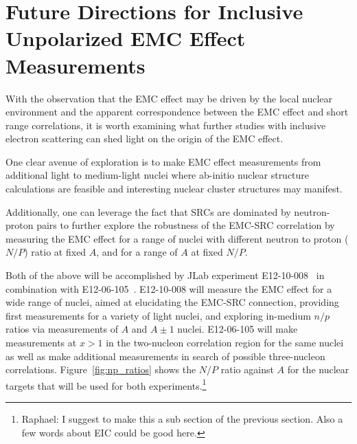 \section{Future Directions for Inclusive Unpolarized EMC Effect Measurements}

With the observation that the EMC effect may be driven by the local nuclear environment
and the apparent correspondence between the EMC effect and short range correlations, it is worth examining what
further studies with inclusive electron scattering can shed light on the origin of the EMC effect.

One clear avenue of exploration is to make EMC effect measurements from additional light to medium-light
nuclei where ab-initio nuclear structure calculations are feasible and interesting nuclear cluster
structures may manifest.

Additionally, one can leverage the fact that SRCs are dominated by neutron-proton pairs to further explore
the robustness of the EMC-SRC correlation by measuring the EMC effect for a range of nuclei with
different neutron to proton ($N/P$) ratio at fixed $A$, and for a range of $A$ at fixed $N/P$.

Both of the above will be accomplished by JLab experiment E12-10-008~\cite{12gev_emc} in combination
with E12-06-105~\cite{12gev_xgt1}. E12-10-008 will measure the EMC effect for a wide range of nuclei,
aimed at elucidating the EMC-SRC connection, providing first measurements for a variety of light nuclei,
and exploring in-medium $n/p$ ratios via measurements of $A$ and $A\pm1$ nuclei.  E12-06-105 will make
measurements at $x>1$ in the two-nucleon correlation region for the same nuclei as well as make additional
measurements in search of possible three-nucleon correlations. Figure~\ref{fig:np_ratios} shows the $N/P$
ratio against $A$ for the nuclear targets that will be used for both experiments.\footnote{Raphael: I suggest
to make this a sub section of the previous section. Also a few words about EIC could be good here.}

